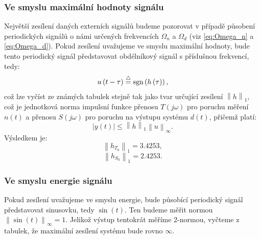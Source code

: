 \documentclass[a4paper,11pt]{article}
\begin{document}
\subsubsection{Ve smyslu maximální hodnoty signálu}
Největší zesílení daných externích signálů budeme pozorovat v případě působení periodických signálů o námi určených frekvencích $ \Omega _{n} $ a $ \Omega _{d}$ (viz \ref{eq:Omega_n} a \ref{eq:Omega_d}). Pokud zesílení uvažujeme ve smyslu maximální hodnoty, bude tento periodický signál představovat obdélníkový signál s příslušnou frekvencí, tedy:
\begin{equation}
u\left ( t-\tau  \right ) \overset{\mathrm{}\triangle}{=}\textup{sgn}\left ( h\left ( \tau  \right ) \right ),
\end{equation}
což lze vyčíst ze známých tabulek stejně tak jako tvar určující zesílení $\left \| h \right \|_{1}$, což je jednotková norma impulsní funkce přenosu $ T\left ( j\omega  \right ) $ pro poruchu měření $ n\left ( t \right ) $ a přenosu $ S\left ( j\omega  \right ) $ pro poruchu na výstupu systému $ d\left ( t \right ) $, přičemž platí:
\begin{equation}
\left |  y\left (t  \right )\right |\leq \left \| h \right \|_{1}\left \| u \right \|_{\infty }.
\end{equation}
Výsledkem je:
$$ \left \| h_{T_{0}} \right \|_{1} = 3.4253 ,$$
$$ \left \| h_{S_{0}} \right \|_{1} = 2.4253 .$$







\newpage 
\subsubsection{Ve smyslu energie signálu}
Pokud zesílení uvažujeme ve smyslu energie, bude působící periodický signál představovat sinusovku, tedy $ \sin \left ( t \right ) $. Ten budeme měřit normou $ \left \| \sin \left ( t \right )  \right \|_{\infty } =1$. Jelikož výstup tentokrát měříme 2-normou, vyčteme z tabulek, že maximální zesílení systému bude rovno $ \infty $.
\end{document}
